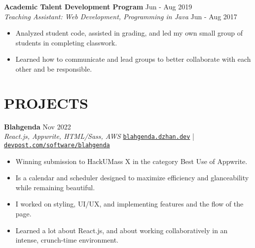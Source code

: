 \documentclass[letterpaper,10pt]{extarticle}
\begin{document}
\noindent
\textbf{Academic Talent Development Program} \hfill Jun - Aug 2019\\ %
\textit{Teaching Assistant: Web Development, Programming in Java} \hfill Jun - Aug 2017 %
\begin{itemize}
    \item Analyzed student code, assisted in grading, and led my own small group of students in completing classwork.
    \item Learned how to communicate and lead groups to better collaborate with each other and be responsible.
\end{itemize}


\section*{PROJECTS}
\noindent
\textbf{Blahgenda} \hfill Nov 2022\\ %
\textit{React.js, Appwrite, HTML/Sass, AWS} \hfill \texttt{\href{https://blahgenda.dzhan.dev}{blahgenda.dzhan.dev}} | \texttt{\href{https://devpost.com/software/blahgenda}{devpost.com/software/blahgenda}}
\begin{itemize}
    \item Winning submission to HackUMass X in the category Best Use of Appwrite.
    \item Is a calendar and scheduler designed to maximize efficiency and glanceability while remaining beautiful.
    \item I worked on styling, UI/UX, and implementing features and the flow of the page.
    \item Learned a lot about React.js, and about working collaboratively in an intense, crunch-time environment.
\end{itemize}
\end{document}
